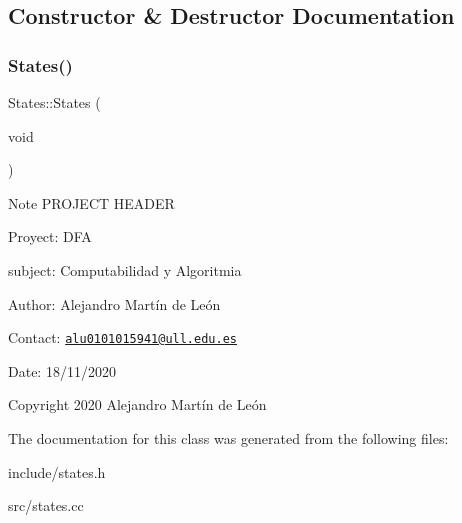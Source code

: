\subsection{Constructor \& Destructor Documentation}
\mbox{\label{classStates_a8cf0b9ef14edb0704c74ac62ea338eab}} 
\subsubsection{\texorpdfstring{States()}{States()}}
{\footnotesize\ttfamily States\+::\+States (\begin{DoxyParamCaption}\item[{void}]{ }\end{DoxyParamCaption})}

\begin{DoxyNote}{Note}
P\+R\+O\+J\+E\+CT H\+E\+A\+D\+ER 

Proyect\+: D\+FA 

subject\+: Computabilidad y Algoritmia 

Author\+: Alejandro Martín de León 

Contact\+: \href{mailto:alu0101015941@ull.edu.es}{\tt alu0101015941@ull.\+edu.\+es} 

Date\+: 18/11/2020 

Copyright 2020 Alejandro Martín de León 
\end{DoxyNote}


The documentation for this class was generated from the following files\+:\begin{DoxyCompactItemize}
\item 
include/states.\+h\item 
src/states.\+cc\end{DoxyCompactItemize}
